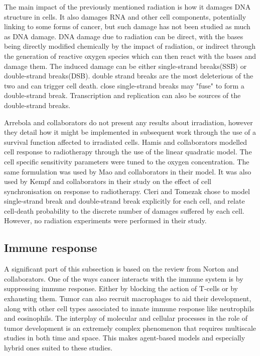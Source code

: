 \documentclass[11pt,a4paper]{article}
\begin{document}
The main impact of the previously mentioned radiation is how it damages DNA structure in cells. It also damages RNA and other cell components, potentially linking to some forms of cancer,\cite{Haruehanroengra2020}\cite{Uddin2020} but such damage has not been studied as much as DNA damage. DNA damage due to radiation can be direct, with the bases being directly modified chemically by the impact of radiation, or indirect through the generation of reactive oxygen species which can then react with the bases and damage them. The induced damage can be either  single-strand breaks(SSB) or double-strand breaks(DSB). double strand breaks are the most deleterious of the two and can trigger cell death.\cite{Kuster2019} close single-strand breaks may "fuse" to form a double-strand break.\cite{Cannan2015} Transcription and replication can also be sources of the double-strand breaks.

Arrebola and collaborators do not present any results about irradiation, however they detail how it might be implemented in subsequent work through the use of a survival function affected to irradiated cells.\cite{Arrebola2020} Hamis and collaborators modelled cell response to radiotherapy through the use of the linear quadratic model. The cell specific sensitivity parameters were tuned to the oxygen concentration.\cite{Hamis2020} The same formulation was used by Mao and collaborators in their model.\cite{Mao2018} It was also used by Kempf and collaborators in their study on the effect of cell synchronisation on response to radiotherapy.\cite{Kempf2013}  Cleri and Tomezak chose to model single-strand break and double-strand break explicitly for each cell, and relate cell-death probability to the discrete number of damages suffered by each cell.\cite{Tomezak2015}\cite{Cleri2019} However, no radiation experiments were performed in their study.

\subsection{Immune response}
A significant part of this subsection is based on the review from Norton and collaborators.\cite{Norton2019} One of the ways cancer interacts with the immune system is by suppressing immune response. Either by blocking the action of T-cells or by exhausting them. Tumor can also recruit macrophages to aid their development, along with other cell types associated to innate immune response like neutrophils and eosinophils. The interplay of molecular and cellular processes in the role of tumor development is an extremely complex phenomenon that requires multiscale studies in both time and space. This makes agent-based models and especially hybrid ones suited to these studies.
\end{document}
